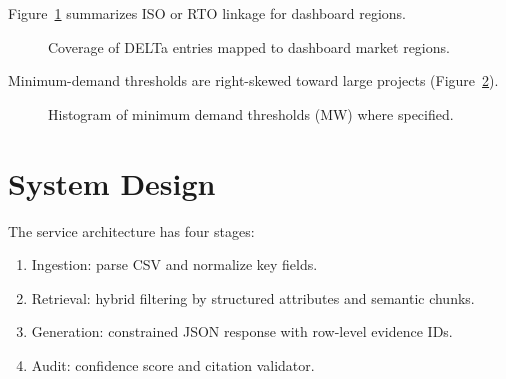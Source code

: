 \documentclass[11pt]{article}
\begin{document}
Figure~\ref{fig:regions} summarizes ISO or RTO linkage for dashboard regions.

\begin{figure}[ht]
\centering
{}
\caption{Coverage of DELTa entries mapped to dashboard market regions.}
\label{fig:regions}
\end{figure}

Minimum-demand thresholds are right-skewed toward large projects (Figure~\ref{fig:hist}).

\begin{figure}[ht]
\centering
{}
\caption{Histogram of minimum demand thresholds (MW) where specified.}
\label{fig:hist}
\end{figure}

\section{System Design}
The service architecture has four stages:
\begin{enumerate}
    \item Ingestion: parse CSV and normalize key fields.
    \item Retrieval: hybrid filtering by structured attributes and semantic chunks.
    \item Generation: constrained JSON response with row-level evidence IDs.
    \item Audit: confidence score and citation validator.
\end{enumerate}
\end{document}
